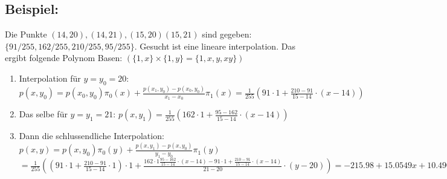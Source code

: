 \subsection{Beispiel:}
Die Punkte $(14,20),(14,21),(15,20)(15,21)$ sind gegeben: $\{91/255, 162/255, 210/255, 95/255\}$. Gesucht ist eine lineare interpolation. 
Das ergibt folgende Polynom Basen: $(\{1,x\}\times\{1,y\}=\{1,x,y,xy\})$\\
\begin{enumerate}
  \item Interpolation für $y=y_0=20$: $p(x,y_0)= p(x_0,y_0) \pi_0(x) + \frac{p(x_1,y_0)-p(x_0,y_0)}{x_1-x_0}\pi_1(x)=\frac{1}{255}\left(91 \cdot 1 + \frac{210-91}{15-14}\cdot(x-14)\right)$
  \item Das selbe für $y=y_1=21$:  $p(x,y_1)=\frac{1}{255}\left(162 \cdot 1 + \frac{95-162}{15-14}\cdot(x-14)\right)$
  \item Dann die schlussendliche Interpolation: $p(x,y)=p(x,y_0)\pi_0(y)+\frac{p(x,y_1)-p(x,y_0)}{y_1-y_0}\pi_1(y)$\\
  $=\frac 1{255} \left((91\cdot 1 +\frac{210-91}{15-14}\cdot 1)\cdot 1 + \frac{162\cdot 1 \frac{95-162}{15-14}\cdot (x-14)-91\cdot 1 + \frac{210-91}{15-14}\cdot(x-14)}{21-20}\cdot(y-20)\right)
  =-215.98 + 15.0549 x + 10.4902 y - 0.7294 x y$
\end{enumerate}
